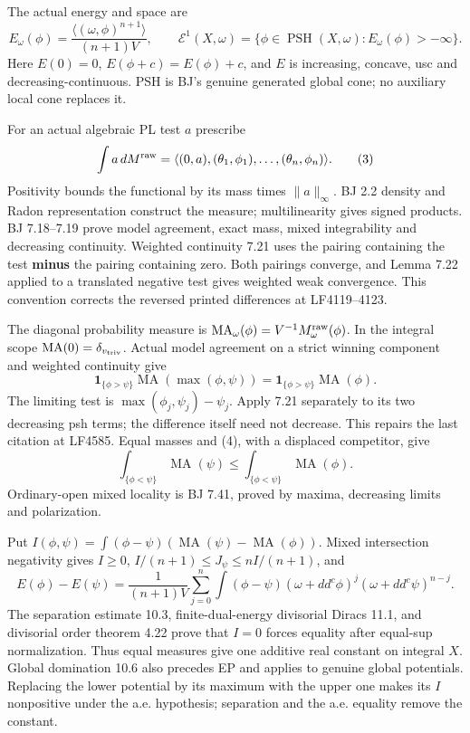 \documentclass[
  10pt,
]{article}
\begin{document}
The actual energy and space are \[
 E_\omega(\phi)=\frac{\langle(\omega,\phi)^{n+1}\rangle}{(n+1)V},\qquad
 \mathcal E^1(X,\omega)=\{\phi\in\operatorname{PSH}(X,\omega):E_\omega(\phi)>-\infty\}.
 \tag{2}
\] Here \(E(0)=0\), \(E(\phi+c)=E(\phi)+c\), and \(E\) is increasing,
concave, usc and decreasing-continuous. PSH is BJ's genuine generated
global cone; no auxiliary local cone replaces it.

For an actual algebraic PL test \(a\) prescribe \[
 \int a\,dM^{\rm raw}=\langle(0,a),(\theta_1,\phi_1),\ldots,(\theta_n,\phi_n)\rangle. \tag{3}
\] Positivity bounds the functional by its mass times \(\|a\|_\infty\).
BJ 2.2 density and Radon representation construct the measure;
multilinearity gives signed products. BJ 7.18--7.19 prove model
agreement, exact mass, mixed integrability and decreasing continuity.
Weighted continuity 7.21 uses the pairing containing the test
\textbf{minus} the pairing containing zero. Both pairings converge, and
Lemma 7.22 applied to a translated negative test gives weighted weak
convergence. This convention corrects the reversed printed differences
at LF4119--4123.

The diagonal probability measure is
\(\operatorname{MA}_\omega(\phi)=V^{-1}M^{\rm raw}_\omega(\phi)\). In
the integral scope \(\operatorname{MA}(0)=\delta_{v_{\rm triv}}\).
Actual model agreement on a strict winning component and weighted
continuity give \[
 \mathbf1_{\{\phi>\psi\}}\operatorname{MA}(\max(\phi,\psi))
 =\mathbf1_{\{\phi>\psi\}}\operatorname{MA}(\phi). \tag{4}
\] The limiting test is \(\max(\phi_j,\psi_j)-\psi_j\). Apply 7.21
separately to its two decreasing psh terms; the difference itself need
not decrease. This repairs the last citation at LF4585. Equal masses and
(4), with a displaced competitor, give
\[\int_{\{\phi<\psi\}}\operatorname{MA}(\psi)
 \le\int_{\{\phi<\psi\}}\operatorname{MA}(\phi). \tag{5}\] Ordinary-open
mixed locality is BJ 7.41, proved by maxima, decreasing limits and
polarization.

Put
\(I(\phi,\psi)=\int(\phi-\psi)(\operatorname{MA}(\psi)-\operatorname{MA}(\phi))\).
Mixed intersection negativity gives \(I\ge0\),
\(I/(n+1)\le J_\psi\le nI/(n+1)\), and
\[E(\phi)-E(\psi)=\frac1{(n+1)V}\sum_{j=0}^n
 \int(\phi-\psi)(\omega+dd^c\phi)^j(\omega+dd^c\psi)^{n-j}. \tag{6}\]
The separation estimate 10.3, finite-dual-energy divisorial Diracs 11.1,
and divisorial order theorem 4.22 prove that \(I=0\) forces equality
after equal-sup normalization. Thus equal measures give one additive
real constant on integral \(X\). Global domination 10.6 also precedes EP
and applies to genuine global potentials. Replacing the lower potential
by its maximum with the upper one makes its \(I\) nonpositive under the
a.e. hypothesis; separation and the a.e. equality remove the constant.
\end{document}
